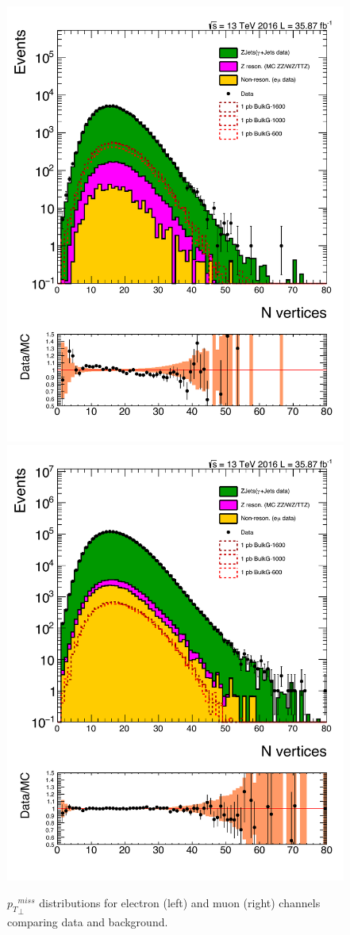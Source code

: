 \begin{figure}[htbp!]
\centering
\includegraphics[width=0.46\linewidth,page=23]{figures/ReMiniSummer16_DT_PhReMiniMCRcFixXsec_GMCPhPtWt_tightzpt50_puWeightsummer16_muoneg_gjet_metfilter_unblind_el_log_1pb.pdf}
\includegraphics[width=0.46\linewidth,page=23]{figures/ReMiniSummer16_DT_PhReMiniMCRcFixXsec_GMCPhPtWt_tightzpt50_puWeightsummer16_muoneg_gjet_metfilter_unblind_mu_log_1pb.pdf}
\caption{${p_{T}}^{miss}_\perp$ distributions for electron (left) and muon (right)
channels comparing data and background.}
\label{fig:gjet_metperp}
\end{figure}

\clearpage
